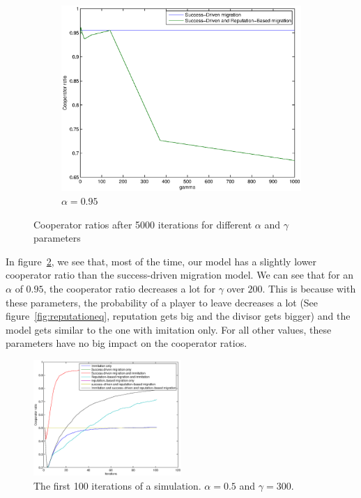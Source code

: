 \documentclass[11pt]{article}
\begin{document}
\begin{figure}
	\begin{subfigure}[t]{0.48\textwidth}
        \includegraphics[width=\textwidth]{../../other/plots/alpha095.eps}
	\caption{$\alpha = 0.95$}
	\label{fig:cooperator_ratios_5000-3}
    	\end{subfigure}

	\caption{Cooperator ratios after 5000 iterations for different $\alpha$ and $\gamma$ parameters}
	\label{fig:cooperator_ratios_5000}
\end{figure}

In figure~\ref{fig:cooperator_ratios_5000}, we see that, most of the time, our model has a slightly lower cooperator ratio than the success-driven migration model.
We can see that for an $\alpha$ of $0.95$, the cooperator ratio decreases a lot for $\gamma$ over $200$. This is because with these parameters, the probability of a player to leave decreases a lot (See figure~\ref{fig:reputationeq}, reputation gets big and the divisor gets bigger) and the model gets similar to the one with imitation only.
For all other values, these parameters have no big impact on the cooperator ratios.

\begin{figure}
	\centering
        \includegraphics[width=0.5\textwidth]{../../other/plots/cooperator-ratio-evolution.eps}
	\caption{The first 100 iterations of a simulation. $\alpha = 0.5$ and $\gamma = 300$.}
	\label{fig:ratio_drop}
\end{figure}
\end{document}
